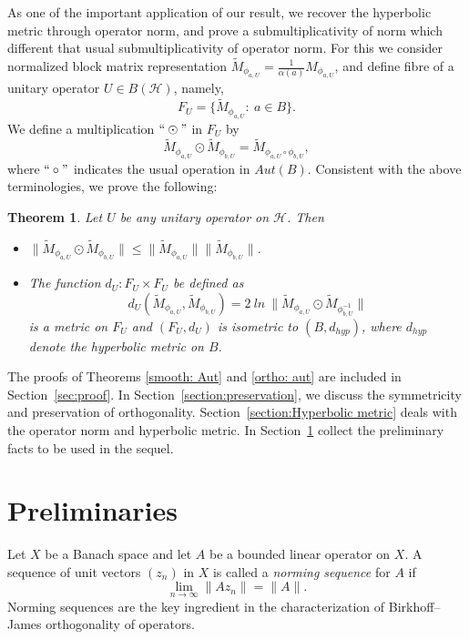 \documentclass[12pt]{amsart}
\newtheorem{theorem}{Theorem}[section]
\theoremstyle{definition}
\renewcommand{\H}{\mathcal{H}}
\begin{document}
\noindent As one of the important application of our result, we recover the hyperbolic metric through operator norm, and prove a submultiplicativity of norm which different that usual submultiplicativity of operator norm. For this we consider normalized block matrix representation $\widetilde{M}_{\phi_{a,U}}=\frac{1}{\alpha(a)}M_{\phi_{a,U}}$, and define fibre of a unitary operator $U\in B(\H)$, namely,
\[
F_{U} = \{\widetilde{M}_{\phi_{a,U}}:~a\in B\}.
\]
We define a multiplication $``\odot"$ in $F_{U}$ by
\[
\widetilde{M}_{\phi_{a,U}}\odot \widetilde{M}_{\phi_{b,U}} = \widetilde{M}_{\phi_{a,U}\circ \phi_{b,U}},
\]
where $``\circ"$ indicates the usual operation in $Aut(B)$. Consistent with the above terminologies, we prove the following:
\begin{theorem}\label{thm:hyp}
Let $U$ be any unitary operator on $\H$. Then
\begin{itemize}
    \item[(a)] $\|\widetilde{M}_{\phi_{a,U}}\odot \widetilde{M}_{\phi_{b,U}}\|\leq \|\widetilde{M}_{\phi_{a,U}}\|\|\widetilde{M}_{\phi_{b,U}}\|$.
    \item[(b)] The function $d_U:F_{U}\times F_{U}$ be defined as
\[
d_U(\widetilde{M}_{\phi_{a,U}},\widetilde{M}_{\phi_{b,U}}) = 2~ln~\|\widetilde{M}_{\phi_{a,U}}\odot \widetilde{M}_{\phi_{b,U}^{-1}}\|
\]
is a metric on $F_U$ and $(F_U,d_U)$ is isometric to $(B,d_{hyp})$, where $d_{hyp}$ denote the hyperbolic metric on $B$.
\end{itemize}
\end{theorem}


\medskip


\noindent The proofs of Theorems \ref{smooth: Aut} and \ref{ortho: aut} are included in Section~\ref{sec:proof}. In Section~\ref{section:preservation}, we discuss the symmetricity and preservation of orthogonality. Section~\ref{section:Hyperbolic metric} deals with the operator norm and hyperbolic metric. In Section~\ref{sec:prelim} collect the preliminary facts to be used in the sequel. 



\medskip




\section{Preliminaries}\label{sec:prelim}

\noindent Let $X$ be a Banach space and let $A$ be a bounded linear operator on $X$. A sequence of unit vectors $(z_n)$ in $X$ is called a \emph{norming sequence} for $A$ if
\[
\lim_{n \to \infty} \|Az_n\| = \|A\|.
\]
Norming sequences are the key ingredient in the characterization of Birkhoff--James orthogonality of operators.
\end{document}
